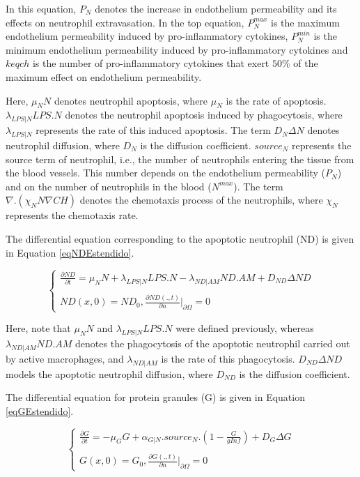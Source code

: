 \documentclass[10pt]{bmc_article}
\newenvironment{bmcformat}{\baselineskip20pt\sloppy\setboolean{publ}{false}}{\baselineskip20pt\sloppy}
\begin{document}
\begin{bmcformat}
In this equation, $P_{N}$ denotes the increase in endothelium permeability and its effects on neutrophil extravasation. 
In the top equation, $P^{max}_{N}$ is the maximum endothelium permeability induced by pro-inflammatory cytokines, 
$P^{min}_{N}$ is the minimum endothelium permeability induced by pro-inflammatory cytokines and $keqch$ is the number of pro-inflammatory 
cytokines that exert $50\%$ of the maximum effect on endothelium permeability. 

Here, $\mu_N N$ denotes neutrophil apoptosis, where $\mu_N$ is the rate of apoptosis. $\lambda _{LPS|N} LPS. N$ denotes the neutrophil 
apoptosis induced by phagocytosis, where $\lambda _{LPS|N}$ represents the rate of this induced apoptosis. The term $D_N \Delta N$ denotes
neutrophil diffusion, where $D_N$ is the diffusion coefficient. $source_{N}$ represents the source term of neutrophil, i.e., the number of 
neutrophils entering the tissue from the blood vessels. This number depends on the endothelium permeability ($P_{N}$) and on the number of
neutrophils in the blood ($N^{max}$). The term $\nabla. (\chi_N N \nabla CH)$ denotes the chemotaxis process of the neutrophils, 
where $\chi_N$ represents the chemotaxis rate. 

The differential equation corresponding to the apoptotic neutrophil (ND) is given in Equation \ref{eqNDEstendido}.

\begin{equation}
\label{eqNDEstendido}
\begin{cases} 
\frac{\partial ND}{\partial t} = \mu_N N + \lambda_{LPS|N} LPS. N - \lambda_{ND|AM} ND.AM + D_{ND} \Delta ND  \\\\
ND(x,0) = ND_0, \frac{\partial ND(.,t)}{\partial n} |_{\partial\Omega} = 0 
\end{cases}
\end{equation}

Here, note that $\mu_N N$ and $\lambda _{LPS|N} LPS. N$ were defined previously, whereas $\lambda _{ND|AM} ND.AM$ denotes the 
phagocytosis of the apoptotic neutrophil carried out by active macrophages, and $\lambda _{ND|AM}$ is the rate of this phagocytosis. 
$D_{ND} \Delta ND$ models the apoptotic neutrophil diffusion, where $D_{ND}$ is the diffusion coefficient. 

The differential equation for protein granules (G) is given in Equation \ref{eqGEstendido}.

\begin{equation}
\label{eqGEstendido}
\begin{cases} 
\frac{\partial G}{\partial t} = -\mu_G G + \alpha _{G|N}.source_{N}.(1 - \frac{G}{gInf}) + D_{G} \Delta G \\\\
G(x,0) =  G_0, \frac{\partial G(.,t)}{\partial n} |_{\partial\Omega} = 0 
\end{cases}
\end{equation}


\end{bmcformat}
\end{document}
